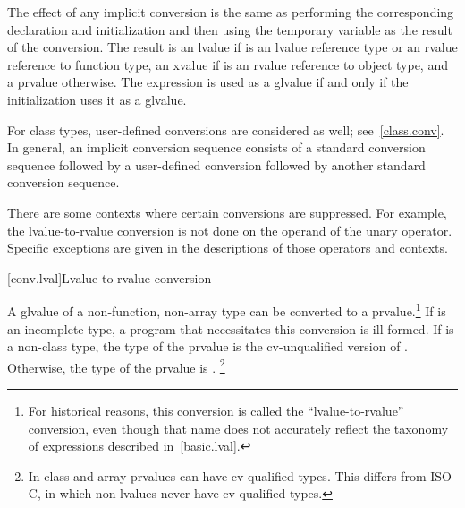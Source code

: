\pnum
The effect of any implicit
conversion is the same as performing the corresponding declaration and initialization
and then using the temporary variable as the result of the conversion.
The result is an lvalue if  is an lvalue reference
type or an rvalue reference to function type,
an xvalue if  is an rvalue reference to object type,
and a prvalue otherwise. The expression 
is used as a glvalue if and only if the initialization uses it as a glvalue.

\pnum
\begin{note}
For class types, user-defined conversions are considered as well;
see~\ref{class.conv}. In general, an implicit conversion
sequence consists of a standard conversion
sequence followed by a user-defined conversion followed by another
standard conversion sequence.
\end{note}

\pnum
\begin{note}
There are some contexts where certain conversions are suppressed. For
example, the lvalue-to-rvalue conversion is not done on the operand of
the unary \tcode{\&} operator. Specific exceptions are given in the
descriptions of those operators and contexts.
\end{note}

[conv.lval]{Lvalue-to-rvalue conversion}

\pnum
{}%
%
A glvalue of a non-function, non-array type 
can be converted to
a prvalue.\footnote{For historical reasons, this conversion is called the ``lvalue-to-rvalue''
conversion, even though that name does not accurately reflect the taxonomy
of expressions described in~\ref{basic.lval}.}
If  is an incomplete type, a
program that necessitates this conversion is ill-formed. If 
is a non-class type, the type of the prvalue is
the cv-unqualified version of . Otherwise, the type of the
prvalue is .%
\footnote{In \Cpp{} class and array prvalues can have cv-qualified types.
This differs from ISO C, in which non-lvalues never have
cv-qualified types.}

